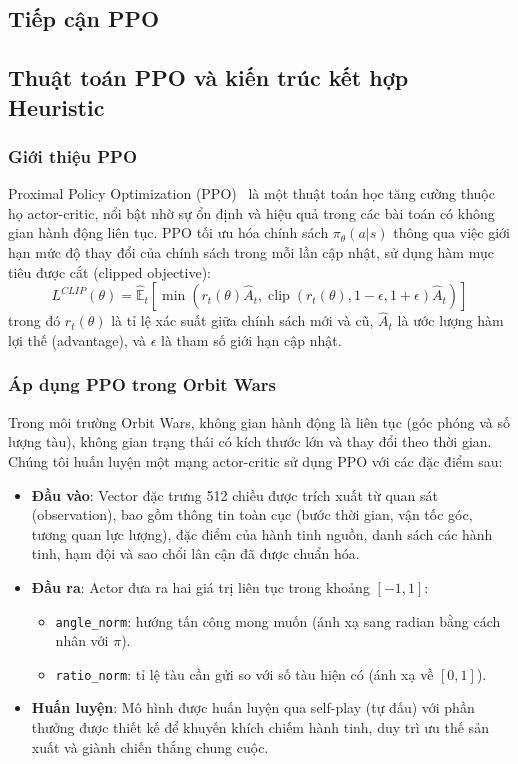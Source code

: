 \subsection{Tiếp cận PPO}

\subsection{Thuật toán PPO và kiến trúc kết hợp Heuristic}

\subsubsection{Giới thiệu PPO}
Proximal Policy Optimization (PPO)~\cite{schulman2017proximal} là một thuật toán học tăng cường thuộc họ actor-critic, nổi bật nhờ sự ổn định và hiệu quả trong các bài toán có không gian hành động liên tục. 
PPO tối ưu hóa chính sách $\pi_\theta(a|s)$ thông qua việc giới hạn mức độ thay đổi của chính sách trong mỗi lần cập nhật, sử dụng hàm mục tiêu được cắt (clipped objective):
\begin{equation}
    L^{CLIP}(\theta) = \hat{\mathbb{E}}_t \left[ \min \left( r_t(\theta) \hat{A}_t, \operatorname{clip}(r_t(\theta), 1-\epsilon, 1+\epsilon) \hat{A}_t \right) \right]
\end{equation}
trong đó $r_t(\theta)$ là tỉ lệ xác suất giữa chính sách mới và cũ, $\hat{A}_t$ là ước lượng hàm lợi thế (advantage), và $\epsilon$ là tham số giới hạn cập nhật.

\subsubsection{Áp dụng PPO trong Orbit Wars}
Trong môi trường Orbit Wars, không gian hành động là liên tục (góc phóng và số lượng tàu), không gian trạng thái có kích thước lớn và thay đổi theo thời gian. 
Chúng tôi huấn luyện một mạng actor-critic sử dụng PPO với các đặc điểm sau:
\begin{itemize}
    \item \textbf{Đầu vào}: Vector đặc trưng 512 chiều được trích xuất từ quan sát (observation), bao gồm thông tin toàn cục (bước thời gian, vận tốc góc, tương quan lực lượng), đặc điểm của hành tinh nguồn, danh sách các hành tinh, hạm đội và sao chổi lân cận đã được chuẩn hóa.
    \item \textbf{Đầu ra}: Actor đưa ra hai giá trị liên tục trong khoảng $[-1, 1]$:
        \begin{itemize}
            \item \texttt{angle\_norm}: hướng tấn công mong muốn (ánh xạ sang radian bằng cách nhân với $\pi$).
            \item \texttt{ratio\_norm}: tỉ lệ tàu cần gửi so với số tàu hiện có (ánh xạ về $[0,1]$).
        \end{itemize}
    \item \textbf{Huấn luyện}: Mô hình được huấn luyện qua self-play (tự đấu) với phần thưởng được thiết kế để khuyến khích chiếm hành tinh, duy trì ưu thế sản xuất và giành chiến thắng chung cuộc.
\end{itemize}

